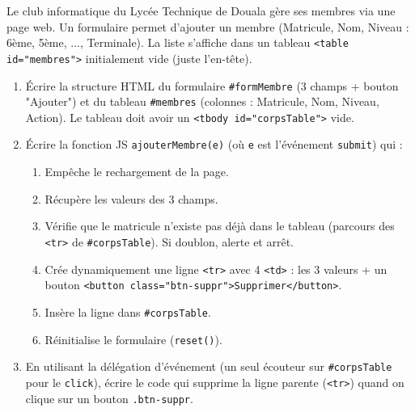 \documentclass[11pt]{article}
\begin{document}
\begin{exercice}
Le club informatique du Lycée Technique de Douala gère ses membres via une page web. Un formulaire permet d'ajouter un membre (Matricule, Nom, Niveau : 6ème, 5ème, ..., Terminale). La liste s'affiche dans un tableau \texttt{<table id="membres">} initialement vide (juste l'en-tête).
\begin{enumerate}
    \item Écrire la structure HTML du formulaire \texttt{\#formMembre} (3 champs + bouton "Ajouter") et du tableau \texttt{\#membres} (colonnes : Matricule, Nom, Niveau, Action). Le tableau doit avoir un \texttt{<tbody id="corpsTable">} vide.
    \item Écrire la fonction JS \texttt{ajouterMembre(e)} (où \texttt{e} est l'événement \texttt{submit}) qui :
    \begin{enumerate}
        \item Empêche le rechargement de la page.
        \item Récupère les valeurs des 3 champs.
        \item Vérifie que le matricule n'existe pas déjà dans le tableau (parcours des \texttt{<tr>} de \texttt{\#corpsTable}). Si doublon, alerte et arrêt.
        \item Crée dynamiquement une ligne \texttt{<tr>} avec 4 \texttt{<td>} : les 3 valeurs + un bouton \texttt{<button class="btn-suppr">Supprimer</button>}.
        \item Insère la ligne dans \texttt{\#corpsTable}.
        \item Réinitialise le formulaire (\texttt{reset()}).
    \end{enumerate}
    \item En utilisant la délégation d'événement (un seul écouteur sur \texttt{\#corpsTable} pour le \texttt{click}), écrire le code qui supprime la ligne parente (\texttt{<tr>}) quand on clique sur un bouton \texttt{.btn-suppr}.
\end{enumerate}
\end{exercice}
\end{document}
